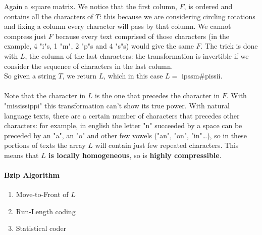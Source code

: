 \documentclass[10pt]{report}
\begin{document}
Again a square matrix. We notice that the first column, $F$, is ordered and contains all the characters of $T$: this because we are considering circling rotations and fixing a column every character will pass by that column. We cannot compress just $F$ because every text comprised of those characters (in the example, 4 "i"s, 1 "m", 2 "p"s and 4 "s"s) would give the same $F$. The trick is done with $L$, the column of the last characters: the transformation is invertible if we consider the sequence of characters in the last column.\\
So given a string $T$, we return $L$, which in this case $L=$ ipssm\#pissii.\\\\
Note that the character in $L$ is the one that precedes the character in $F$. With "mississippi" this transformation can't show its true power. With natural language texts, there are a certain number of characters that precedes other characters: for example, in english the letter "n" succeeded by a space can be preceded by an "a", an "o" and other few vowels ("an", "on", "in"\ldots), so in these portions of texts the array $L$ will contain just few repeated characters. This means that \textbf{$L$ is locally homogeneous}, so is \textbf{highly compressible}.
\paragraph{Bzip Algorithm}
\begin{enumerate}
	\item Move-to-Front of $L$
	\item Run-Length coding
	\item Statistical coder
\end{enumerate}
\end{document}

